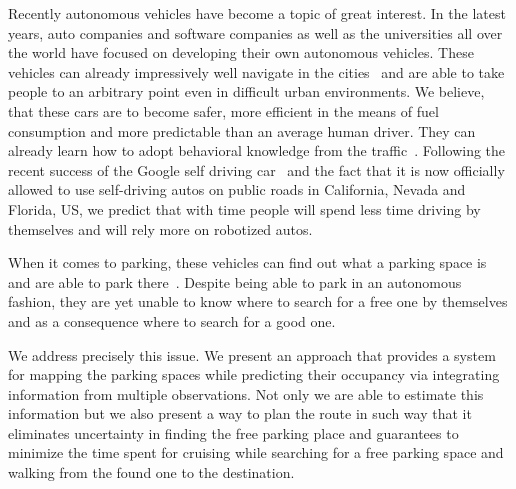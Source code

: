 Recently autonomous vehicles have become a topic of great interest. In the
latest years, auto companies and software companies as well as the
universities all over the world have focused on developing their own
autonomous vehicles. These vehicles can already impressively well navigate in
the cities~\cite{stanley_auto_car,perceprion_drivec_car,lima13} and are able
to take people to an arbitrary point even in difficult urban environments. We
believe, that these cars are to become safer, more efficient in the means of
fuel consumption and more predictable than an average human driver. They can
already learn how to adopt behavioral knowledge from the
traffic~\cite{behaviour_learning,spinello10:multiclass}. Following the recent
success of the Google self driving car~\cite{markoff2010google} and the fact
that it is now officially allowed to use self-driving autos on public roads in
California, Nevada and Florida, US, we predict that with time people will
spend less time driving by themselves and will rely more on robotized autos.

When it comes to parking, these vehicles can find out what a parking space is
and are able to park
there~\cite{auto_cars_burgard,auto_parking09,auto_park2_11}. Despite being
able to park in an autonomous fashion, they are yet unable to know where to
search for a free one by themselves and as a consequence where to search for a
good one.

We address precisely this issue. We present an approach that provides a system
for mapping the parking spaces while predicting their occupancy via
integrating information from multiple observations. Not only we are able to
estimate this information but we also present a way to plan the route in such
way that it eliminates uncertainty in finding the free parking place and
guarantees to minimize the time spent for cruising while searching for a free
parking space and walking from the found one to the destination.

